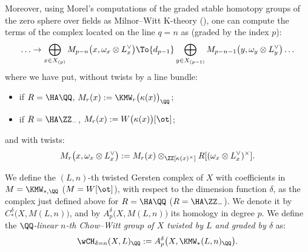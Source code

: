 Moreover, using Morel's computations of the graded stable homotopy groups of the zero sphere over fields
as Milnor--Witt K-theory (\cf \cite{MorelA1}),
one can compute the terms of the complex located on the line $q=n$ as (graded by the index $p$):
\begin{equation*}
\hdots \to \bigoplus_{x \in X_{(p)}} M_{p-n}\big(x,\omega_x \otimes L_x^\vee\big)
\To{d_{p-1}} \bigoplus_{y \in X_{(p-1)}} M_{p-n-1}\big(y,\omega_y \otimes L_y^\vee\big) \hdots
\end{equation*}
where we have put, without twists by a line bundle:
\begin{itemize}
\item if $R=\HA \QQ$, $M_r(x):=\KMW_r\big(\kappa(x)\big)_\QQ$;
\item if $R=\HA \ZZ_-$, $M_r(x):=W\big(\kappa(x)\big)[\ot]$;
\end{itemize}
and with twists:
\[
M_r\big(x,\omega_x \otimes L_x^\vee\big):=M_r(x) \otimes_{\ZZ[\kappa(x)^\times]} R[(\omega_x \otimes L_x^\vee)^\times].
\]

\begin{df}
\label{df:CHtilde}
We define the $(L,n)$-th twisted Gersten complex of $X$ with coefficients in $M=\KMW_{*,\QQ}$
(\resp $M=W[\ot]$),
with respect to the dimension function $\delta$, as the complex just defined above
for $R=\HA \QQ$ (\resp $R=\HA \ZZ_-$).
We denote it by $C^\delta_*\big(X,M(L,n)\big)$,
and by $A^\delta_p\big(X,M(L,n)\big)$ its homology in degree $p$.
We define the \emph{$\QQ$-linear $n$-th Chow--Witt group of $X$ twisted by $L$ and graded by $\delta$} as:
\[
\wCH_{\delta=n}(X,L)_\QQ:=A^\delta_p\big(X,\KMW_*(L,n)_\QQ\big).
\]
\end{df}

